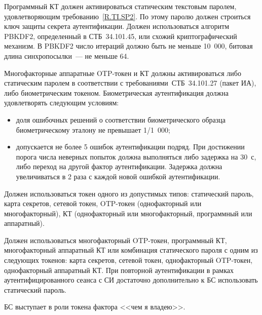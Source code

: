 
Программный КТ должен активироваться статическим текстовым  
паролем, удовлетворяющим требованию~\ref{R.TI.SP2}.
По этому паролю должен строиться ключ защиты секрета аутентификации.
Должен использоваться алгоритм PBKDF2, определенный в СТБ~34.101.45,
или схожий криптографический механизм.
%
В PBKDF2 число итераций должно быть не меньше 10~000,
битовая длина синхропосылки~--- не меньше 64.

Многофакторные аппаратные OTP-токен и КТ должны активироваться 
либо статическим паролем в соответствии с требованиями~СТБ~34.101.27 (пакет ИА),
либо биометрическим токеном.
%
Биометрическая аутентификация должна удовлетворять следующим условиям:
\begin{itemize}
\item
доля ошибочных решений о соответствии биометрического образца биометрическому эталону 
не превышает 1/1~000;
% 
%
%
\item
допускается не более 5 ошибок аутентификации подряд. При достижении порога числа
неверных попыток должна выполняться либо задержка на 30~с, либо
переход на другой фактор аутентификации. Задержка должна увеличиваться в 2 раза
с каждой новой ошибкой аутентификации.
\end{itemize}


Должен использоваться токен одного из допустимых типов:
статический пароль, карта секретов, сетевой токен,
OTP-токен (однофакторный или многофакторный), 
КТ (однофакторный или многофакторный, программный или аппаратный).

\label{R.TI.AAL2}
Должен использоваться многофакторный OTP-токен, программный КТ, многофакторный  
аппаратный КТ или комбинация статического пароля с одним из следующих токенов:
карта секретов, сетевой токен, однофакторный OTP-токен, 
однофакторный аппаратный КТ. 
%
При повторной аутентификации в рамках аутентифицированного сеанса с СИ 
достаточно дополнительно к БС использовать статический пароль.

\begin{note*}
БС выступает в роли токена фактора <<чем я владею>>.
\end{note*}

